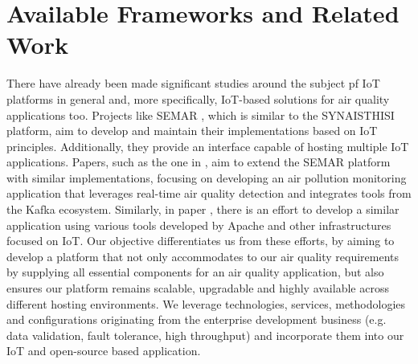 \chapter{Available Frameworks and Related Work}
\label{chap3}

There have already been made significant studies around the subject pf IoT platforms in general and, more specifically, IoT-based solutions for air quality applications too. Projects like SEMAR \cite{SEMARIoTServer}, which is similar to the SYNAISTHISI platform, aim to develop and maintain their implementations based on IoT principles. Additionally, they provide an interface capable of hosting multiple IoT applications. Papers, such as the one in \cite{SEMARkafka}, aim to extend the SEMAR platform with similar implementations, focusing on developing an air pollution monitoring application that leverages real-time air quality detection and integrates tools from the Kafka ecosystem.
Similarly, in paper \cite{HandlingStreamAirPollutionData}, there is an effort to develop a similar application using various tools developed by Apache and other infrastructures focused on IoT. Our objective differentiates us from these efforts, by aiming to develop a platform that not only accommodates to our air quality requirements by supplying all essential components for an air quality application, but also ensures our platform remains scalable, upgradable and highly available across different hosting environments. We leverage technologies, services, methodologies and configurations originating from the enterprise development business (e.g. data validation, fault tolerance, high throughput) and incorporate them into our IoT and open-source based application.

